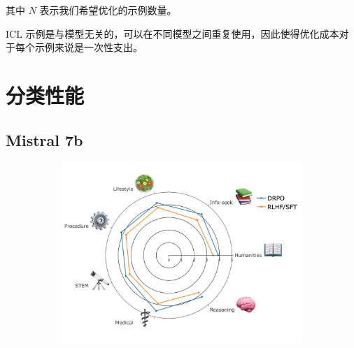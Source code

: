 其中 $N$ 表示我们希望优化的示例数量。

ICL 示例是与模型无关的，可以在不同模型之间重复使用，因此使得优化成本对于每个示例来说是一次性支出。

\newpage


\section{分类性能}
\label{sec:cat_perf}
\subsection{Mistral 7b}
\begin{figure}[h]
\centering
\begin{subfigure}[b]{.5\textwidth}
  \centering
  \includegraphics[width=0.95\linewidth]{images/mistral_1.png}
  \label{fig:cat_mistral_1}
\end{subfigure}

\vspace{1em}


\end{figure}
